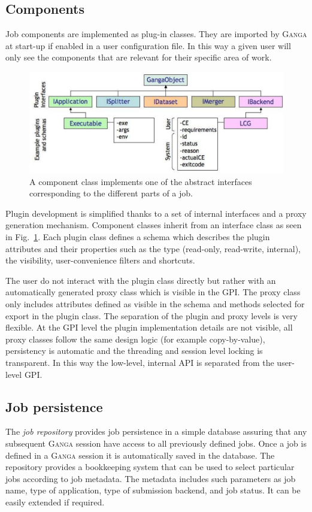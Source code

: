 \documentclass{elsart}
\def\ganga {\textsc{Ganga}\xspace}
\def\GPI{GPI\xspace}
\begin{document}
\subsection{Components}
\label{sec:ComponentImplementation}
Job components are implemented as plug-in classes. They are imported by \ganga
at start-up if enabled in a user configuration file. In this way a given user
will only see the components that are relevant for their specific area of
work.

\begin{figure}
  \centering
  \includegraphics[width=14cm]{GangaPlugin.pdf}  
  \caption{A component class implements one of the abstract interfaces
    corresponding to the different parts of a job.}
  \label{fig:Components}
\end{figure}
Plugin development is simplified thanks to a set of internal interfaces and a
proxy generation mechanism. Component classes inherit from an interface class
as seen in Fig.~\ref{fig:Components}. Each plugin class defines a schema which
describes the plugin attributes and their properties such as the type
(read-only, read-write, internal), the visibility, user-convenience filters
and shortcuts.

The user do not interact with the plugin class directly but rather with an
automatically generated proxy class which is visible in the \GPI. The proxy
class only includes attributes defined as visible in the schema and methods
selected for export in the plugin class. The separation of the plugin and
proxy levels is very flexible. At the \GPI level the plugin implementation
details are not visible, all proxy classes follow the same design logic (for
example copy-by-value), persistency is automatic and the threading and session
level locking is transparent. In this way the low-level, internal API is
separated from the user-level \GPI.

\subsection{Job persistence}
\label{sec:persistence}
The \emph{job repository} provides job persistence in a simple database
assuring that any subsequent \ganga session have access to all previously
defined jobs. Once a job is defined in a \ganga session it is automatically
saved in the database. The repository provides a bookkeeping system that can
be used to select particular jobs according to job metadata. The metadata
includes such parameters as job name, type of application, type of submission
backend, and job status. It can be easily extended if required.
\end{document}
